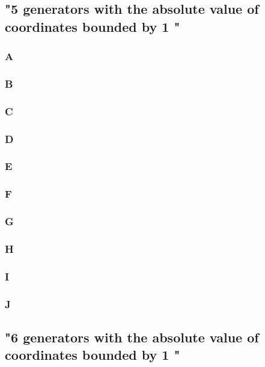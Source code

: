 \subsection{"5 generators with the absolute value of coordinates bounded by 1
"}

\subsubsection{A}

\newpage
\subsubsection{B}

\newpage
\subsubsection{C}

\newpage
\subsubsection{D}

\newpage
\subsubsection{E}

\newpage
\subsubsection{F}

\newpage
\subsubsection{G}

\newpage
\subsubsection{H}

\newpage
\subsubsection{I}

\newpage
\subsubsection{J}

\newpage
\subsection{"6 generators with the absolute value of coordinates bounded by 1
"}

